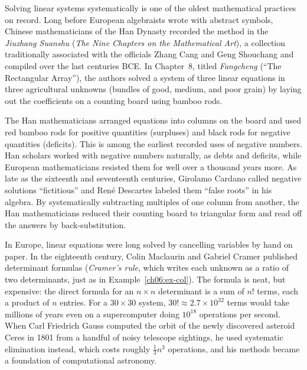 \begin{historybox}
Solving linear systems systematically is one of the oldest mathematical
practices on record. Long before European algebraists wrote with abstract
symbols, Chinese mathematicians of the Han Dynasty recorded the method in
the \emph{Jiuzhang Suanshu} (\emph{The Nine Chapters on the Mathematical
Art}), a collection traditionally associated with the officials Zhang Cang
and Geng Shouchang and compiled over the last centuries BCE. In
Chapter~8, titled \emph{Fangcheng} (``The Rectangular Array''), the authors
solved a system of three linear equations in three agricultural unknowns
(bundles of good, medium, and poor grain) by laying out the coefficients on a
counting board using bamboo rods.

The Han mathematicians arranged equations into columns on the board and used
red bamboo rods for positive quantities (surpluses) and black rods for negative
quantities (deficits). This is among the earliest recorded uses of negative
numbers. Han scholars worked with negative numbers naturally, as debts and
deficits, while European mathematicians resisted them for well over a
thousand years more. As late as the sixteenth and seventeenth centuries,
Girolamo Cardano called negative solutions ``fictitious'' and Ren\'e Descartes
labeled them ``false roots'' in his algebra. By systematically subtracting
multiples of one column from another, the Han mathematicians reduced their
counting board to triangular form and read off the answers by back-substitution.

In Europe, linear equations were long solved by cancelling variables by
hand on paper. In the eighteenth century, Colin Maclaurin and Gabriel Cramer
published determinant formulas (\emph{Cramer's rule}, which writes each
unknown as a ratio of two determinants, just as in
Example~\ref{ch06:ex-col}). The formula is neat, but expensive: the direct
formula for an $n\times n$ determinant is a sum of $n!$ terms, each a
product of $n$ entries. For a $30\times 30$ system,
$30! \approx 2.7 \times 10^{32}$ terms would take millions of years even
on a supercomputer doing $10^{18}$ operations per second. When Carl
Friedrich Gauss computed the orbit of the newly discovered asteroid Ceres
in 1801 from a handful of noisy telescope sightings, he used systematic
elimination instead, which costs roughly $\tfrac{1}{3}n^3$ operations, and
his methods became a foundation of computational astronomy.


\end{historybox}
